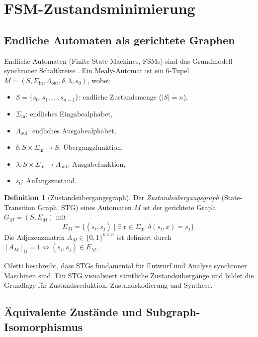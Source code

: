 ﻿\documentclass[a4paper,12pt]{article}
\theoremstyle{definition}
\newtheorem{definition}{Definition}
\begin{document}
\section{FSM-Zustandsminimierung}

\subsection{Endliche Automaten als gerichtete Graphen}

Endliche Automaten (Finite State Machines, FSMs) sind das Grundmodell synchroner
Schaltkreise \cite[Kap.~3]{ciletti2011}. Ein Mealy-Automat ist ein 6-Tupel
$M = (S, \Sigma_{\text{in}}, \Lambda_{\text{out}}, \delta, \lambda, s_0)$, wobei:

\begin{itemize}
  \item $S = \{s_0, s_1, \ldots, s_{n-1}\}$: endliche Zustandsmenge ($|S| = n$),
  \item $\Sigma_{\text{in}}$: endliches Eingabealphabet,
  \item $\Lambda_{\text{out}}$: endliches Ausgabealphabet,
  \item $\delta: S \times \Sigma_{\text{in}} \to S$: Übergangsfunktion,
  \item $\lambda: S \times \Sigma_{\text{in}} \to \Lambda_{\text{out}}$: Ausgabefunktion,
  \item $s_0$: Anfangszustand.
\end{itemize}

\begin{definition}[Zustandsübergangsgraph]
  Der \emph{Zustandsübergangsgraph} (State-Transition Graph, STG) eines Automaten $M$ ist
  der gerichtete Graph $G_M = (S, E_M)$ mit
  \[
    E_M = \bigl\{(s_i, s_j) \;\big|\; \exists\, x \in \Sigma_{\text{in}}: \delta(s_i, x) = s_j\bigr\}.
  \]
  Die Adjazenzmatrix $A_M \in \{0,1\}^{n \times n}$ ist definiert durch
  $[A_M]_{ij} = 1 \Leftrightarrow (s_i, s_j) \in E_M$.
\end{definition}

Ciletti \cite[S.~82]{ciletti2011} beschreibt, dass STGs fundamental für Entwurf und
Analyse synchroner Maschinen sind. Ein STG visualisiert sämtliche Zustandsübergänge
und bildet die Grundlage für Zustandsreduktion, Zustandskodierung und Synthese.

\subsection{Äquivalente Zustände und Subgraph-Isomorphismus}
\end{document}
